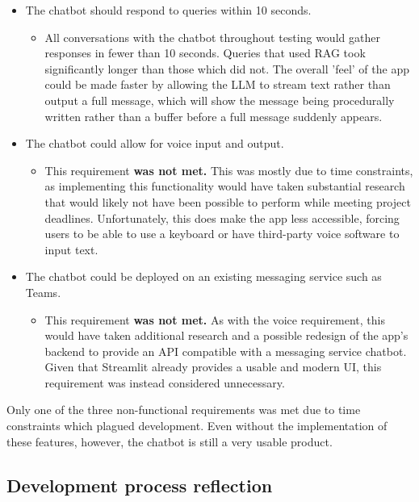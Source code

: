 \begin{itemize}
    \item The chatbot should respond to queries within 10 seconds.
    \begin{itemize}
        \item All conversations with the chatbot throughout testing would gather responses 
        in fewer than 10 seconds. Queries that used RAG took significantly longer than those which 
        did not. The overall 'feel' of the app could be made faster by allowing the LLM to stream 
        text rather than output a full message, which will show the message being procedurally written 
        rather than a buffer before a full message suddenly appears.
    \end{itemize}
    \item The chatbot could allow for voice input and output.
    \begin{itemize}
        \item This requirement \textbf{was not met.} This was mostly due to time constraints, as implementing this 
        functionality would have taken substantial research that would likely not have been possible to perform 
        while meeting project deadlines. Unfortunately, this does make the app less accessible, forcing users 
        to be able to use a keyboard or have third-party voice software to input text.
    \end{itemize}
    \item The chatbot could be deployed on an existing messaging service such as Teams.
    \begin{itemize}
        \item This requirement \textbf{was not met.} As with the voice requirement, this would have taken additional 
        research and a possible redesign of the app's backend to provide an API compatible with a messaging 
        service chatbot. Given that Streamlit already provides a usable and modern UI, this requirement was instead 
        considered unnecessary.
    \end{itemize}
\end{itemize}

\noindent Only one of the three non-functional requirements was met due to time constraints which plagued development.
Even without the implementation of these features, however, the chatbot is still a very usable product.

\subsection{Development process reflection}\label{sec:EvalProcess}
